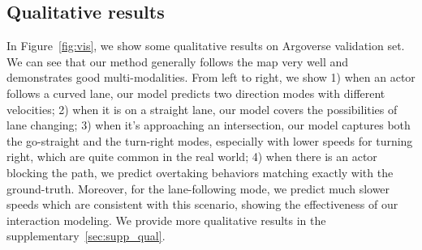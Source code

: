 \subsection{Qualitative results}
In Figure~\ref{fig:vis}, we show some qualitative results on Argoverse validation
set. We can see that our method generally follows the map very well and demonstrates good
multi-modalities. From left to right, we show 1) when an actor follows a
curved lane, our model predicts two direction modes with different velocities;
2) when it is on a straight lane, our model covers the possibilities of lane changing; 3)
when it's approaching an intersection, our model captures both the go-straight and the
turn-right modes, especially with lower speeds for turning right, which are
quite common in the real world; 4) when there is an actor blocking the path, we
predict overtaking behaviors matching exactly with the ground-truth. Moreover,
for the lane-following mode, we predict much slower speeds which are consistent with
this scenario, showing the effectiveness of our interaction modeling. 
We provide more qualitative results in the supplementary~\ref{sec:supp_qual}.

